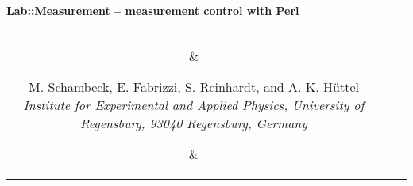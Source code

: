 \documentclass[portrait]{a0poster}
\begin{document}
\color{text}
\Large
%
\newlength{\seplength}
\newlength{\headerheight}
\newlength{\columnheight}
\newlength{\columnheighta}
\newlength{\columnheightb}
%
\setlength{\columnheight}{107cm}
\setlength{\columnheighta}{\columnheight-6cm}
\setlength{\columnheightb}{\columnheight+6.5cm}
\setlength{\columnwidth}{0.31\textwidth}
%
\setlength{\fboxsep}{10mm}
\setlength{\fboxrule}{0mm}
%
%
%
%
\hspace*{-1cm}\begin{minipage}[t][][t]{\textwidth-2\fboxsep-8\fboxrule}
\color{invheading}
\begin{center}
{
\VERYHuge \vspace*{-0.6cm}
\textsf{\textbf{
Lab::Measurement -- measurement control with Perl
}}
}
\\[\baselineskip]
\begin{tabular}{ccc}
\parbox{5cm}{\vspace*{-1cm}
\begin{center}
\end{center}
}
&
\parbox{70cm}{
\begin{center} 
{
\vspace*{-0.5cm}
\huge 
M. Schambeck, E. Fabrizzi, S. Reinhardt, and A. K. Hüttel
}
\\[\medskipamount]
{\it 
\Large
Institute for Experimental and Applied
Physics, University of Regensburg, 93040 Regensburg, Germany\\
}
\end{center}
\vspace*{0.5cm}
}
&
\parbox{5cm}{\vspace*{-1cm}
\begin{center}
\end{center}
}
\end{tabular}
\end{center}
\end{minipage}
\vspace*{9mm}
\end{document}
